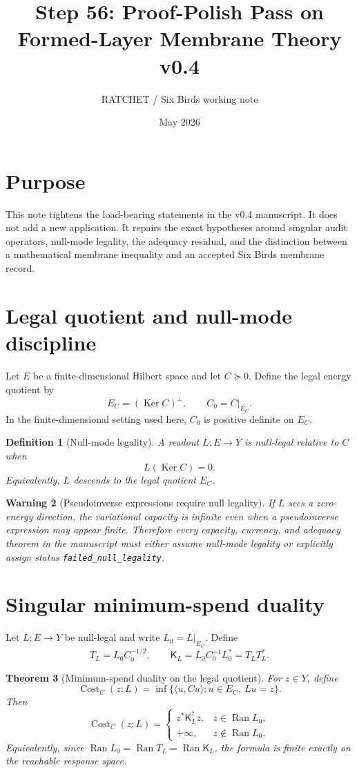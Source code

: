 \documentclass[11pt]{article}
\title{Step 56: Proof-Polish Pass on Formed-Layer Membrane Theory v0.4}
\author{RATCHET / Six Birds working note}
\date{May 2026}
\newtheorem{theorem}{Theorem}[section]
\newtheorem{definition}[theorem]{Definition}
\newtheorem{warning}[theorem]{Warning}
\DeclareMathOperator{\Ran}{Ran}
\DeclareMathOperator{\Ker}{Ker}
\DeclareMathOperator{\Cost}{Cost}
\newcommand{\K}{\mathsf K}
\begin{document}
\maketitle

\section{Purpose}
This note tightens the load-bearing statements in the v0.4 manuscript.  It does not add a new application.  It repairs the exact hypotheses around singular audit operators, null-mode legality, the adequacy residual, and the distinction between a mathematical membrane inequality and an accepted Six Birds membrane record.

\section{Legal quotient and null-mode discipline}

Let $E$ be a finite-dimensional Hilbert space and let $C\succeq0$.  Define the legal energy quotient by
\[
  E_C=(\Ker C)^\perp,
  \qquad
  C_0=C|_{E_C}.
\]
In the finite-dimensional setting used here, $C_0$ is positive definite on $E_C$.

\begin{definition}[Null-mode legality]
A readout $L:E\to Y$ is null-legal relative to $C$ when
\[
  L(\Ker C)=0.
\]
Equivalently, $L$ descends to the legal quotient $E_C$.
\end{definition}

\begin{warning}[Pseudoinverse expressions require null legality]
If $L$ sees a zero-energy direction, the variational capacity is infinite even when a pseudoinverse expression may appear finite.  Therefore every capacity, currency, and adequacy theorem in the manuscript must either assume null-mode legality or explicitly assign status \texttt{failed\_null\_legality}.
\end{warning}

\section{Singular minimum-spend duality}

Let $L:E\to Y$ be null-legal and write $L_0=L|_{E_C}$.  Define
\[
  T_L=L_0C_0^{-1/2},
  \qquad
  \K_L=L_0C_0^{-1}L_0^*=T_LT_L^*.
\]

\begin{theorem}[Minimum-spend duality on the legal quotient]
For $z\in Y$, define
\[
  \Cost_C(z;L)=\inf\{\langle u,Cu\rangle:u\in E_C,
  \ Lu=z\}.
\]
Then
\[
  \Cost_C(z;L)=
  \begin{cases}
  z^*\K_L^\dagger z, & z\in\Ran L_0,\\
  +\infty, & z\notin\Ran L_0.
  \end{cases}
\]
Equivalently, since $\Ran L_0=\Ran T_L=\Ran\K_L$, the formula is finite exactly on the reachable response space.
\end{theorem}
\end{document}

